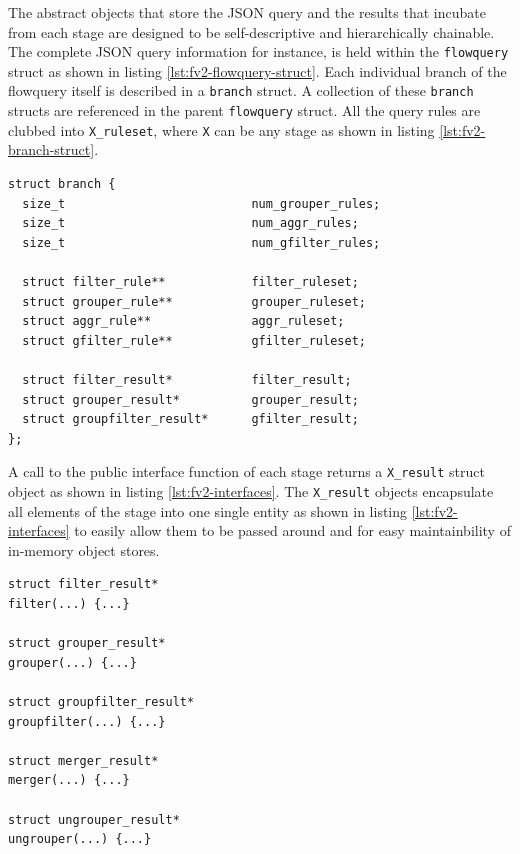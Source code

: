 The abstract objects that store the JSON query and the results that incubate
from each stage are designed to be self-descriptive and hierarchically
chainable. The complete JSON query information for instance, is held within
the \texttt{flowquery}  struct as shown
in listing \ref{lst:fv2-flowquery-struct}. Each individual branch of the
flowquery itself is described in a \texttt{branch} struct. A collection of
these \texttt{branch} structs are referenced in the parent \texttt{flowquery}
struct. All the query rules are clubbed into \texttt{X\_ruleset}, where
\texttt{X} can be any stage as shown in listing \ref{lst:fv2-branch-struct}.

\begin{lstlisting}
struct branch {
  size_t                          num_grouper_rules;
  size_t                          num_aggr_rules;
  size_t                          num_gfilter_rules;

  struct filter_rule**            filter_ruleset;
  struct grouper_rule**           grouper_ruleset;
  struct aggr_rule**              aggr_ruleset;
  struct gfilter_rule**           gfilter_ruleset;

  struct filter_result*           filter_result;
  struct grouper_result*          grouper_result;
  struct groupfilter_result*      gfilter_result;
};
\end{lstlisting}

A call to the public interface function of each stage returns a
\texttt{X\_result} struct object as shown in listing \ref{lst:fv2-interfaces}.
The \texttt{X\_result} objects encapsulate all elements  of the stage into one single entity as shown in listing
\ref{lst:fv2-interfaces} to easily allow them to be passed around and for easy
maintainbility of in-memory object stores.

\begin{lstlisting}
struct filter_result*
filter(...) {...}

struct grouper_result*
grouper(...) {...}

struct groupfilter_result*
groupfilter(...) {...}

struct merger_result*
merger(...) {...}

struct ungrouper_result*
ungrouper(...) {...}
\end{lstlisting}

